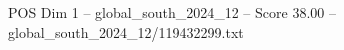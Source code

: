 \begin{textsample}{POS Dim 1 – global\_south\_2024\_12 – Score 38.00 – global\_south\_2024\_12/119432299.txt}
\end{textsample}
